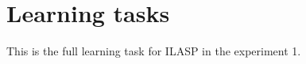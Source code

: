 \section{Learning tasks}
\label{appendix:learning_tasks}

This is the full learning task for ILASP in the experiment 1. 







